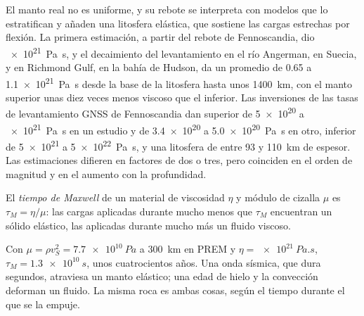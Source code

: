 El manto real no es uniforme, y su rebote se interpreta con modelos que lo estratifican
y añaden una litosfera elástica, que sostiene las cargas estrechas por flexión. La
primera estimación, a partir del rebote de Fennoscandia, dio \qty{e21}{Pa.s}, y el
decaimiento del levantamiento en el río Angerman, en Suecia, y en Richmond Gulf, en la
bahía de Hudson, da un promedio de 0.65 a \qty{1.1e21}{Pa.s} desde la base de la
litosfera hasta unos \qty{1400}{km}, con el manto superior unas diez veces
menos viscoso que el inferior. Las inversiones de las tasas de levantamiento GNSS de
Fennoscandia dan  superior de \num{5e20} a \qty{e21}{Pa.s}
en un estudio y de \num{3.4e20} a \qty{5.0e20}{Pa.s} en otro, 
inferior de \num{5e21} a \qty{5e22}{Pa.s}, y una litosfera de entre 93 y
\qty{110}{km} de espesor. Las estimaciones difieren en factores de dos o tres, pero
coinciden en el orden de magnitud y en el aumento con la profundidad.

\begin{definition}\label{def:b3:mantle-convection:maxwell}
El \emph{tiempo de Maxwell} de un material de viscosidad $\eta$
y módulo de cizalla $\mu$ es $\tau_M = \eta/\mu$: las cargas aplicadas durante mucho menos que
$\tau_M$ encuentran un sólido elástico, las aplicadas durante mucho más un fluido viscoso.
\end{definition}

Con $\mu = \rho v_S^2 = \qty{7.7e10}{Pa}$ a \qty{300}{km} en PREM y $\eta =
\qty{e21}{Pa.s}$, $\tau_M = \qty{1.3e10}{s}$, unos cuatrocientos años. Una
onda sísmica, que dura segundos, atraviesa un manto elástico; una edad de hielo y la
convección deforman un fluido. La misma roca es ambas cosas, según el tiempo durante el que
se la empuje.

